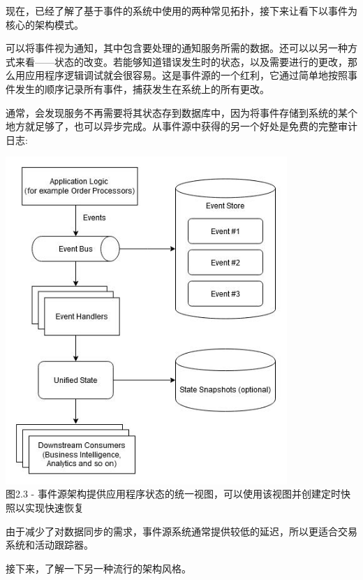 现在，已经了解了基于事件的系统中使用的两种常见拓扑，接下来让看下以事件为核心的架构模式。


可以将事件视为通知，其中包含要处理的通知服务所需的数据。还可以以另一种方式来看——状态的改变。若能够知道错误发生时的状态，以及需要进行的更改，那么用应用程序逻辑调试就会很容易。这是事件源的一个红利，它通过简单地按照事件发生的顺序记录所有事件，捕获发生在系统上的所有更改。

通常，会发现服务不再需要将其状态存到数据库中，因为将事件存储到系统的某个地方就足够了，也可以异步完成。从事件源中获得的另一个好处是免费的完整审计日志:

\begin{center}
\includegraphics[width=0.8\textwidth]{content/1/chapter2/images/3.jpg}\\
图2.3 - 事件源架构提供应用程序状态的统一视图，可以使用该视图并创建定时快照以实现快速恢复
\end{center}

由于减少了对数据同步的需求，事件源系统通常提供较低的延迟，所以更适合交易系统和活动跟踪器。

接下来，了解一下另一种流行的架构风格。






















